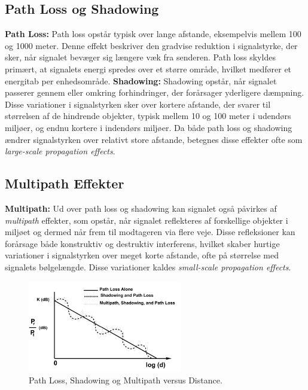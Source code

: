 \documentclass[a4paper,12pt]{book}
\begin{document}
	\subsection{Path Loss og Shadowing}
	\textbf{Path Loss:} Path loss opstår typisk over lange afstande, eksempelvis mellem 100 og 1000 meter. Denne effekt beskriver den gradvise reduktion i signalstyrke, der sker, når signalet bevæger sig længere væk fra senderen. Path loss skyldes primært, at signalets energi spredes over et større område, hvilket medfører et energitab per enhedsområde.
	\newline\newline\noindent
	\textbf{Shadowing:} Shadowing opstår, når signalet passerer gennem eller omkring forhindringer, der forårsager yderligere dæmpning. Disse variationer i signalstyrken sker over kortere afstande, der svarer til størrelsen af de hindrende objekter, typisk mellem 10 og 100 meter i udendørs miljøer, og endnu kortere i indendørs miljøer.
	\newline\newline\noindent
	Da både path loss og shadowing ændrer signalstyrken over relativt store afstande, betegnes disse effekter ofte som \textit{large-scale propagation effects}.
	
	\subsection{Multipath Effekter}
	\textbf{Multipath:} Ud over path loss og shadowing kan signalet også påvirkes af \textit{multipath} effekter, som opstår, når signalet reflekteres af forskellige objekter i miljøet og dermed når frem til modtageren via flere veje. Disse refleksioner kan forårsage både konstruktiv og destruktiv interferens, hvilket skaber hurtige variationer i signalstyrken over meget korte afstande, ofte på størrelse med signalets bølgelængde. Disse variationer kaldes \textit{small-scale propagation effects}.

	\begin{figure}[h]
		\centering
		\includegraphics[width=0.6\textwidth]{fig/fig1.png}
		\caption{Path Loss, Shadowing og Multipath versus Distance.}
		\label{fig:path_loss_shadowing}
	\end{figure}
	
\end{document}
